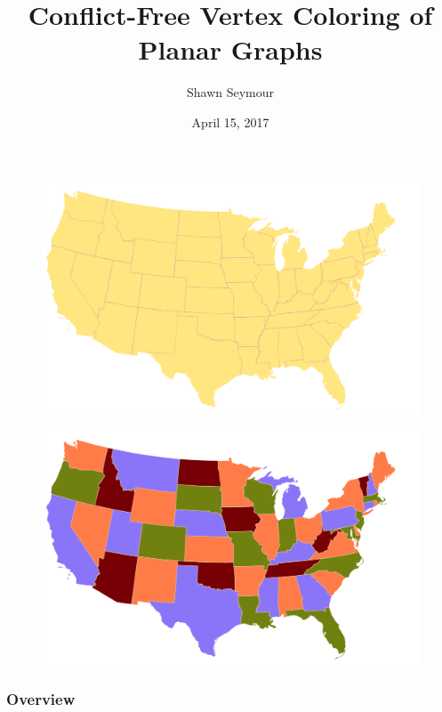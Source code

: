 \documentclass[xcolor=dvipsnames,aspectratio=1610]{beamer}
\title{Conflict-Free Vertex Coloring of Planar Graphs}
\date{April 15, 2017}
\author{Shawn Seymour}
\begin{document}
  \maketitle

  \begin{frame}
    \begin{figure}[h]
      \centering
      \includegraphics[width=14cm]{../figures/map-no-colors.pdf}
    \end{figure}
  \end{frame}

  \begin{frame}
    \begin{figure}[h]
      \centering
      \includegraphics[width=14cm]{../figures/map-colors.pdf}
    \end{figure}
  \end{frame}

  \begin{frame}
    \frametitle{Overview}
    \begin{multicols}{2}
      \tableofcontents
    \end{multicols}
  \end{frame}
\end{document}
